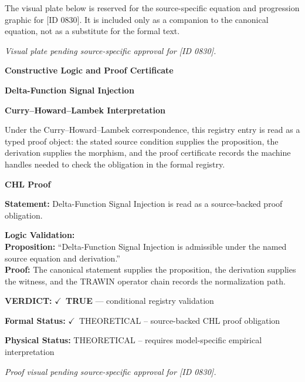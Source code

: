\begingroup\footnotesize\sloppy
The visual plate below is reserved for the source-specific equation and progression graphic for [ID 0830]. It is included only as a companion to the canonical equation, not as a substitute for the formal text.
\par\endgroup
\begingroup\footnotesize\itshape
Visual plate pending source-specific approval for [ID 0830].
\par\endgroup

\clearpage
\begingroup\tzpsupportsetup
\noindent\textbf{\fontsize{10.8pt}{12.8pt}\selectfont [ID 0830] Constructive Logic and Proof Certificate}\par
\noindent\textbf{\fontsize{10pt}{12pt}\selectfont Delta-Function Signal Injection}\par
\vspace{0.45em}
\begingroup
\footnotesize
\setlength{\parskip}{0.22em}
\setlength{\parindent}{0pt}
\noindent\textbf{Curry--Howard--Lambek Interpretation}\par
Under the Curry--Howard--Lambek correspondence, this registry entry is read as a typed proof
object: the stated source condition supplies the proposition, the derivation supplies the
morphism, and the proof certificate records the machine handles needed to check the obligation
in the formal registry.

\vspace{0.45em}
\noindent\textbf{CHL Proof}\par
\textbf{Statement:} Delta-Function Signal Injection is read as a source-backed proof obligation.

\textbf{Logic Validation:}\\
\textbf{Proposition:} ``Delta-Function Signal Injection is admissible under the named source equation and derivation.''\\
\textbf{Proof:} The canonical statement supplies the proposition, the derivation supplies the witness, and the TRAWIN operator chain records the normalization path.

\textbf{VERDICT:} \ensuremath{\checkmark}\ \textbf{TRUE} --- conditional registry validation

\textbf{Formal Status:} \ensuremath{\checkmark}\ THEORETICAL -- source-backed CHL proof obligation

\textbf{Physical Status:} THEORETICAL -- requires model-specific empirical interpretation
\par\vspace{0.45em}
\par
\vfill
\begingroup\footnotesize\itshape
Proof visual pending source-specific approval for [ID 0830].
\par\endgroup
\vfill
\endgroup
\endgroup
